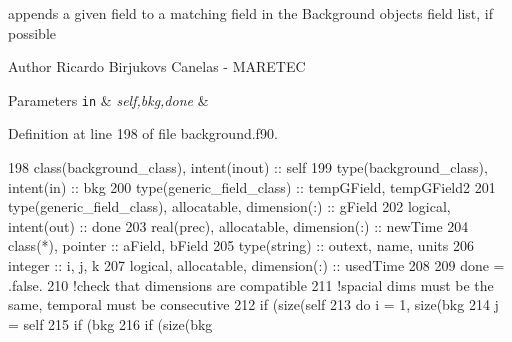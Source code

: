 appends a given field to a matching field in the Background object\textquotesingle{}s field list, if possible 

\begin{DoxyAuthor}{Author}
Ricardo Birjukovs Canelas -\/ M\+A\+R\+E\+T\+EC 
\end{DoxyAuthor}

\begin{DoxyParams}[1]{Parameters}
\mbox{\tt in}  & {\em self,bkg,done} & \\
\hline
\end{DoxyParams}


Definition at line 198 of file background.\+f90.


\begin{DoxyCode}
198     \textcolor{keywordtype}{class}(background\_class), \textcolor{keywordtype}{intent(inout)} :: self
199     \textcolor{keywordtype}{type}(background\_class), \textcolor{keywordtype}{intent(in)} :: bkg
200     \textcolor{keywordtype}{type}(generic\_field\_class) :: tempGField, tempGField2
201     \textcolor{keywordtype}{type}(generic\_field\_class), \textcolor{keywordtype}{allocatable}, \textcolor{keywordtype}{dimension(:)} :: gField
202     \textcolor{keywordtype}{logical}, \textcolor{keywordtype}{intent(out)} :: done
203     \textcolor{keywordtype}{real(prec)}, \textcolor{keywordtype}{allocatable}, \textcolor{keywordtype}{dimension(:)} :: newTime
204     \textcolor{keywordtype}{class}(*), \textcolor{keywordtype}{pointer} :: aField, bField
205     \textcolor{keywordtype}{type}(string) :: outext, name, units
206     \textcolor{keywordtype}{integer} :: i, j, k
207     \textcolor{keywordtype}{logical}, \textcolor{keywordtype}{allocatable}, \textcolor{keywordtype}{dimension(:)} :: usedTime
208 
209     done = .false.
210     \textcolor{comment}{!check that dimensions are compatible}
211     \textcolor{comment}{!spacial dims must be the same, temporal must be consecutive}
212     \textcolor{keywordflow}{if} (\textcolor{keyword}{size}(self%
213         \textcolor{keywordflow}{do} i = 1, \textcolor{keyword}{size}(bkg%
214             j = self%
215             \textcolor{keywordflow}{if} (bkg%
216                 \textcolor{keywordflow}{if} (\textcolor{keyword}{size}(bkg%

\end{DoxyCode}
